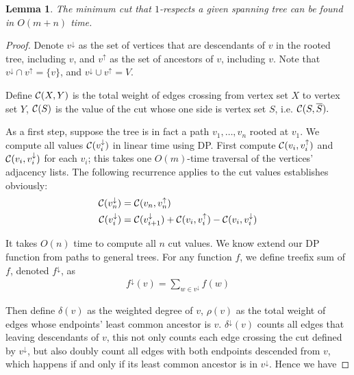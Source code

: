 \documentclass[12pt]{article}
\newcommand{\descendants}[1]{#1^\downarrow}
\newcommand{\ancestors}[1]{{#1}^\uparrow}
\newcommand{\cutval}[1]{{\cal C}(#1)}
\newcommand{\crossweight}[2]{{\cal C}(#1,#2)}
\theoremstyle{plain}
\newtheorem{lemma}{Lemma}[section]
\begin{document}
\begin{lemma}
    The minimum cut that $1$-respects a given spanning tree can be found in $O(m+n)$ time.
\end{lemma}

\begin{proof}
    Denote $\descendants{v}$ as the set of vertices that are descendants of $v$ in the rooted tree, including $v$, and $\ancestors{v}$ as the set of ancestors of $v$, including $v$. Note that $\descendants{v}\cap\ancestors{v}=\{v\}$, and $\descendants{v}\cup\ancestors{v}=V$.

    Define $\crossweight{X}{Y}$ is the total weight of edges crossing from vertex set $X$ to vertex set $Y$, $\cutval{S}$ is the value of the cut whose one side is vertex set $S$, i.e. $\crossweight{S}{\overline{S}}.$

    As a first step, suppose the tree is in fact a path $v_1,\ldots,v_n$ rooted at $v_1$.  We compute all values $\cutval{\descendants{v_i}}$ in linear time using DP. First compute $\crossweight{v_i}{\ancestors{v}_i}$ and $\crossweight{v_i}{\descendants{v}_i}$ for each $v_i$; this takes one $O(m)$-time traversal of the vertices' adjacency lists. The following recurrence applies to the cut values establishes obviously:
    \begin{align*}
    \cutval{\descendants{v_n}} &= \crossweight{v_n}{\ancestors{v}_n}\\ 
    \cutval{\descendants{v_i}} &= \cutval{\descendants{v}_{i+1}}+\crossweight{v_i}{\ancestors{v}_i} -\crossweight{v_i}{\descendants{v}_i}
    \end{align*}

    It takes $O(n)$ time to compute all $n$ cut values. We know extend our DP function from paths to general trees. For any function $f$, we define treefix sum of $f$, denoted $\descendants{f}$, as
    \begin{align*}
        \descendants{f}(v)=\sum_{w\in\descendants{v}}f(w)
    \end{align*}

    Then define $\delta(v)$ as the weighted degree of $v$, $\rho(v)$ as the total weight of edges whose endpoints' least common ancestor is $v$. $\descendants{\delta}(v)$ counts all edges that leaving descendants of $v$, this not only counts each edge crossing the cut defined by $\descendants{v}$, but also doubly count all edges with both endpoints descended from $v$, which happens if and only if its least common ancestor is in $\descendants{v}$. Hence we have


\end{proof}
\end{document}
